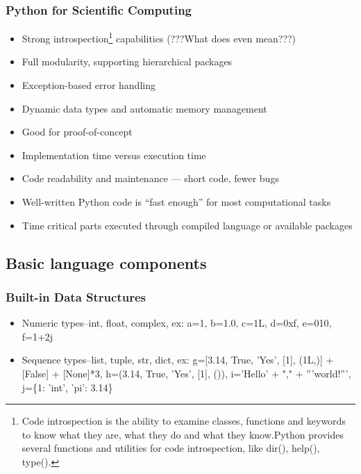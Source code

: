 
\begin{frame}
  \MyLogo
  \frametitle{Python for Scientific Computing}  

\small

\begin{itemize}
	\item Strong introspection\footnote {Code introspection is the ability to examine classes, functions and keywords to know what they are, what they do and what they know.Python provides several functions and utilities for code introspection, like dir(), help(), type().} capabilities (???What does even mean???)
	
	\item Full modularity, supporting hierarchical packages
	\item Exception-based error handling
	\item Dynamic data types and automatic memory management
\end{itemize}

\begin{itemize}
	\item Good for proof-of-concept
	\item Implementation time versus execution time
	\item Code readability and maintenance --- short code, fewer bugs
	\item Well-written Python code is ``fast enough'' for most computational tasks
	\item Time critical parts executed through compiled language or \alert{available packages}
\end{itemize}

\end{frame}

\subsection{Basic language components}

\begin{frame}
  \MyLogo
  \frametitle{Built-in Data Structures}  
\small

\begin{itemize}
	\item Numeric types--int, float, complex, ex: a=1, b=1.0, c=1L, d=0xf, e=010, f=1+2j
	\item Sequence types--list, tuple, str, dict, ex: g=[3.14, True, 'Yes', [1], (1L,)] + [False] + [None]*3, h=(3.14, True, 'Yes', [1], ()), i='Hello' + "," + '''world!''', j=\{1: 'int', 'pi': 3.14\}

\end{itemize}

\end{frame}

